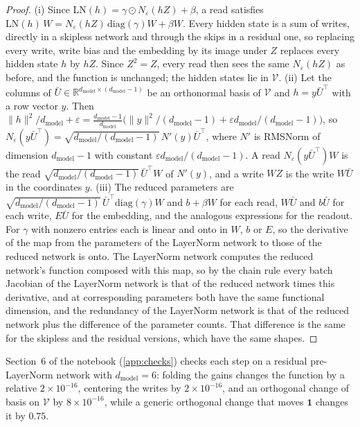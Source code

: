 \documentclass[10pt]{article}
\theoremstyle{definition}
\theoremstyle{remark}
\newcommand{\R}{\mathbb{R}}
\newcommand{\dm}{d_{\mathrm{model}}}
\newcommand{\norm}[1]{\lVert #1\rVert}
\begin{document}
\begin{proof}
(i) Since $\mathrm{LN}(h) = \gamma\odot N_\varepsilon(hZ) + \beta$, a read satisfies $\mathrm{LN}(h)\,W = N_\varepsilon(hZ)\,\mathrm{diag}(\gamma)W + \beta W$. Every hidden state is a sum of writes, directly in a skipless network and through the skips in a residual one, so replacing every write, write bias and the embedding by its image under $Z$ replaces every hidden state $h$ by $hZ$. Since $Z^2 = Z$, every read then sees the same $N_\varepsilon(hZ)$ as before, and the function is unchanged; the hidden states lie in $\mathcal V$.
(ii) Let the columns of $\bar U \in \R^{\dm\times(\dm-1)}$ be an orthonormal basis of $\mathcal V$ and $h = y\bar U^\top$ with a row vector $y$. Then $\norm{h}^2/\dm + \varepsilon = \tfrac{\dm-1}{\dm}\big(\norm{y}^2/(\dm-1) + \varepsilon \dm/(\dm-1)\big)$, so $N_\varepsilon(y\bar U^\top) = \sqrt{\dm/(\dm-1)}\,N'(y)\bar U^\top$, where $N'$ is RMSNorm of dimension $\dm-1$ with constant $\varepsilon \dm/(\dm-1)$. A read $N_\varepsilon(y\bar U^\top)W$ is the read $\sqrt{\dm/(\dm-1)}\,\bar U^\top W$ of $N'(y)$, and a write $WZ$ is the write $W\bar U$ in the coordinates $y$.
(iii) The reduced parameters are $\sqrt{\dm/(\dm-1)}\,\bar U^\top\mathrm{diag}(\gamma)W$ and $b + \beta W$ for each read, $W\bar U$ and $b\bar U$ for each write, $E\bar U$ for the embedding, and the analogous expressions for the readout. For $\gamma$ with nonzero entries each is linear and onto in $W$, $b$ or $E$, so the derivative of the map from the parameters of the LayerNorm network to those of the reduced network is onto. The LayerNorm network computes the reduced network's function composed with this map, so by the chain rule every batch Jacobian of the LayerNorm network is that of the reduced network times this derivative, and at corresponding parameters both have the same functional dimension, and the redundancy of the LayerNorm network is that of the reduced network plus the difference of the parameter counts. That difference is the same for the skipless and the residual versions, which have the same shapes.
\end{proof}

Section~6 of the notebook (\cref{app:checks}) checks each step on a residual pre-LayerNorm network with $\dm = 6$: folding the gains changes the function by a relative $2\times10^{-16}$, centering the writes by $2\times10^{-16}$, and an orthogonal change of basis on $\mathcal V$ by $8\times10^{-16}$, while a generic orthogonal change that moves $\mathbf 1$ changes it by $0.75$.
\end{document}

